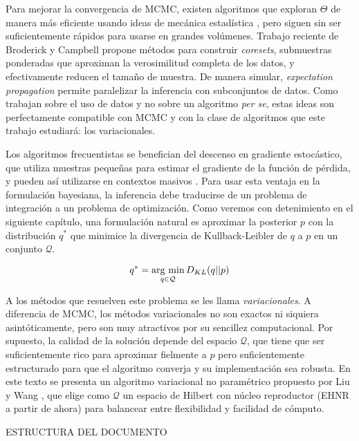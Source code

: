 \documentclass[main.tex]{subfiles}
\begin{document}
Para mejorar la convergencia de MCMC, existen algoritmos que exploran $\Theta$ de manera más eficiente usando ideas de mecánica estadística \cite{betancourt-hmc}, pero siguen sin ser suficientemente rápidos para usarse en grandes volúmenes. Trabajo reciente de Broderick y Campbell \cite{coresets, coresets-greedy} propone métodos para construir \textit{coresets}, submuestras ponderadas que aproximan la verosimilitud completa de los datos, y efectivamente reducen el tamaño de muestra. De manera simular, \textit{expectation propagation} \cite{ep} permite paralelizar la inferencia con subconjuntos de datos. Como trabajan sobre el uso de datos y no sobre un algoritmo \textit{per se}, estas ideas son perfectamente compatible con MCMC y con la clase de algoritmos que este trabajo estudiará: los variacionales.

Los algoritmos frecuentistas se benefician del descenso en gradiente estocástico, que utiliza muestras pequeñas para estimar el gradiente de la función de pérdida, y pueden así utilizarse en contextos masivos \cite{goodfellow}. Para usar esta ventaja en la formulación bayesiana, la inferencia debe traducirse de un problema de integración a un problema de optimización. Como veremos con detenimiento en el siguiente capítulo, una formulación natural es aproximar la posterior $p$ con la distribución $q^*$ que minimice la divergencia de Kullback-Leibler de $q$ a $p$ en un conjunto $\mathcal{Q}$.  


\begin{equation}
	q^* = \operatorname*{arg\,\min}_{q \in \mathcal{Q}} D_{KL}(q || p)
	\label{eqn:vi}	
\end{equation}

A los métodos que resuelven este problema se les llama \textit{variacionales}. A diferencia de MCMC, los métodos variacionales no son exactos ni siquiera asintóticamente, pero son muy atractivos por su sencillez computacional. Por supuesto,  la calidad de la solución depende del espacio $\mathcal{Q}$, que tiene que ser suficientemente rico para aproximar fielmente a $p$ pero suficientemente estructurado para que el algoritmo converja y su implementación sea robusta. En este texto se presenta un algoritmo variacional no paramétrico propuesto por Liu y Wang \cite{svgd}, que elige como $\mathcal{Q}$ un espacio de Hilbert con núcleo reproductor (EHNR a partir de ahora) para balancear entre flexibilidad y facilidad de cómputo. 

%
{\color{red} ESTRUCTURA DEL DOCUMENTO}
\end{document}
